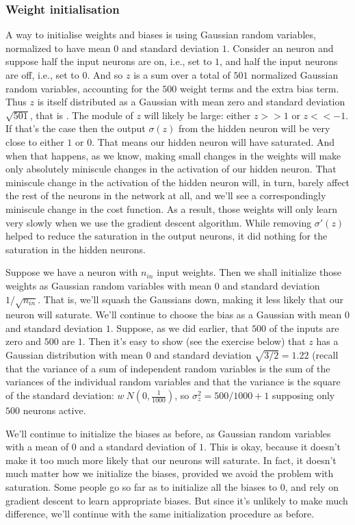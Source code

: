 \subsubsection{Weight initialisation}
A way to initialise weights and biases is using Gaussian random variables, normalized to have mean $0$ and standard deviation $1$. Consider an neuron and suppose  half the input neurons are on, i.e., set to $1$, and half the input neurons are off, i.e., set to $0$. And so $z$ is a sum over a total of $501$ normalized Gaussian random variables, accounting for the $500$ weight terms and the extra bias term. Thus $z$ is itself distributed as a Gaussian with mean zero and standard deviation $\sqrt{501}$, that is . The module of $z$ will likely be large: either $z>>1$ or $z<<-1$. If that's the case then the output $\sigma(z)$ from the hidden neuron will be very close to either $1$ or $0$. That means our hidden neuron will have saturated.  And when that happens, as we know, making small changes in the weights will make only absolutely miniscule changes in the activation of our hidden neuron. That miniscule change in the activation of the hidden neuron will, in turn, barely affect the rest of the neurons in the network at all, and we'll see a correspondingly miniscule change in the cost function. As a result, those weights will only learn very slowly when we use the gradient descent algorithm. While removing $\sigma'(z)$ helped to reduce the saturation in the output neurons, it did nothing for the saturation in the hidden neurons.
 
Suppose we have a neuron with $n_{in}$ input weights. Then we shall initialize those weights as Gaussian random variables with mean $0$ and standard deviation $1/\sqrt{n_{in}}$. That is, we'll squash the Gaussians down, making it less likely that our neuron will saturate. We'll continue to choose the bias as a Gaussian with mean $0$ and standard deviation $1$. Suppose, as we did earlier, that $500$ of the inputs are zero and $500$ are $1$. Then it's easy to show (see the exercise below) that $z$ has a Gaussian distribution with mean $0$ and standard deviation $\sqrt{3/2}=1.22$ (recall that the variance of a sum of independent random variables is the sum of the variances of the individual random variables and that the variance is the square of the standard deviation: $w~ N(0, \frac{1}{1000})$, so $\sigma_z^2 = 500/1000 + 1$ supposing only $500$ neurons active.

We'll continue to initialize the biases as before, as Gaussian random variables with a mean of $0$ and a standard deviation of $1$. This is okay, because it doesn't make it too much more likely that our neurons will saturate. In fact, it doesn't much matter how we initialize the biases, provided we avoid the problem with saturation. Some people go so far as to initialize all the biases to $0$, and rely on gradient descent to learn appropriate biases. But since it's unlikely to make much difference, we'll continue with the same initialization procedure as before.


